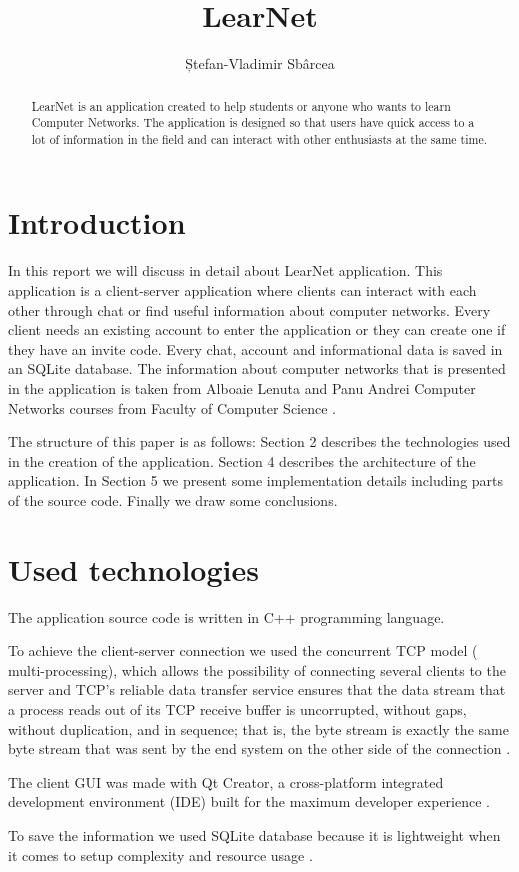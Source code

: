 \documentclass[runningheads]{llncs}
\title{LearNet}
\author{Ștefan-Vladimir Sbârcea}
\institute{ Faculty of Computer Science, Alexandru Ioan Cuza University of Iasi
\email{stefan.sbarcea@info.uaic.ro}}
\begin{document}
\maketitle

\begin{abstract}
LearNet is an application created to help students or anyone who wants to learn Computer Networks. The application is designed so that users have quick access to a lot of information in the field and can interact with other enthusiasts at the same time.
\end{abstract}


\section{Introduction}
\par In this report we will discuss in detail about LearNet application. This application is a client-server application where clients can interact with each other through chat or find useful information about computer networks. Every client needs an existing account to enter the application or they can create one if they have an invite code. Every chat, account and informational data is saved in an SQLite database. The information about computer networks that is presented in the application is taken from Alboaie Lenuta and Panu Andrei Computer Networks courses from Faculty of Computer Science \cite{computernetworks}.
\par The structure of this paper is as follows: Section 2 describes the technologies used in the creation of the application. Section 4 describes the architecture of the application. In Section 5 we present some implementation details including parts of the source code. Finally we draw some conclusions.

\section{Used technologies}
\par The application source code is written in C++ programming language.
\par To achieve the client-server connection we used the concurrent TCP model ( multi-processing), which allows the possibility of connecting several clients to the server and TCP’s reliable
data transfer service ensures that the data stream that a process reads out of its TCP receive buffer is uncorrupted, without gaps, without duplication, and in sequence; that is, the byte stream is exactly the same byte stream that was sent by the end system on the other side of the connection \cite{kurose1986computer}. 
\par The client GUI was made with Qt Creator, a cross-platform integrated development environment (IDE) built for the maximum developer experience \cite{qtcreator}. 
\par To save the information we used SQLite database because it is lightweight when it comes to setup complexity and resource usage \cite{kreibich2010using}. 
\end{document}
